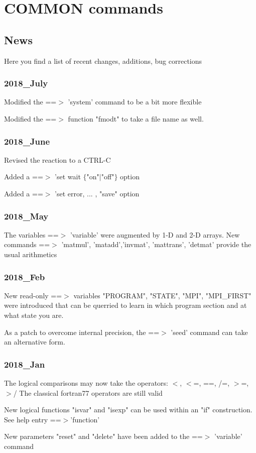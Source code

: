 \chapter{COMMON commands}
\section{News}
\par
Here you find a list of recent changes, additions, bug corrections 
\subsection*{2018\_July}
\par
Modified the ==$> $ 'system' command to be a bit more flexible 
\par
Modified the ==$> $ function "fmodt" to take a file name as well. 
\subsection*{2018\_June}
\par
Revised the reaction to a CTRL-C 
\par
Added a ==$> $ 'set wait $ \{$"on"$| $"off"$\} $ option 
\par
Added a ==$> $ 'set error, ... , "save" option 
\subsection*{2018\_May}
\par
The variables ==$> $ 'variable' were augmented by 1-D and 2-D arrays. 
New commands ==$> $ 'matmul', 'matadd','invmat', 'mattrans', 
'detmat' provide the usual arithmetics 
\subsection*{2018\_Feb}
\par
New read-only ==$> $ variables "PROGRAM", "STATE", "MPI", "MPI\_FIRST" 
were introduced that can be querried to learn in which program 
section and at what state you are. 
\par
As a patch to overcome internal precision, the ==$> $ 'seed' command 
can take an alternative form. 
\subsection*{2018\_Jan}
\par
The logical comparisons may now take the operators: 
$ <$, $ <$=, ==, /=, $> $=, $> $/ 
The classical fortran77 operators are still valid 
\par
New logical functions "isvar" and "isexp" can be used within an 
"if" construction. See help entry ==$> $'function' 
\par
New parameters "reset" and "delete" have been added to the 
==$> $ 'variable' command 
